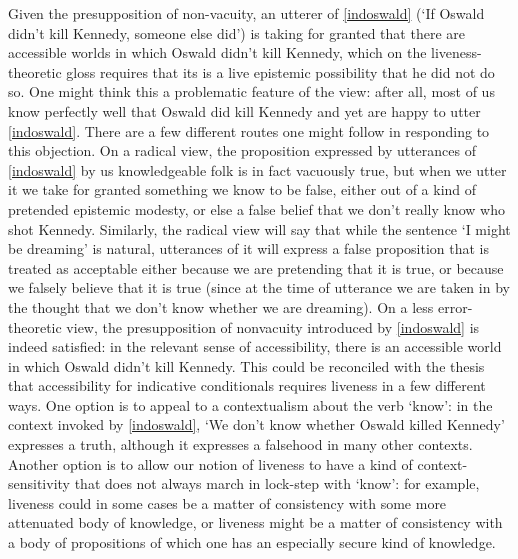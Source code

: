 \documentclass[If.tex]{subfiles}
\begin{document}
Given the presupposition of non-vacuity, an utterer of \ref{indoswald} (‘If Oswald didn't kill Kennedy, someone else did’) is taking for granted that there are accessible worlds in which Oswald didn't kill Kennedy, which on the liveness-theoretic gloss requires that its is a live epistemic possibility that he did not do so. One might think this a problematic feature of the view: after all, most of us know perfectly well that Oswald did kill Kennedy and yet are happy to utter \ref{indoswald}. There are a few different routes one might follow in responding to this objection. On a radical view, the proposition expressed by utterances of \ref{indoswald} by us knowledgeable folk is in fact vacuously true, but when we utter it we take for granted something we know to be false, either out of a kind of pretended epistemic modesty, or else a false belief that we don't really know who shot Kennedy. Similarly, the radical view will say that while the sentence ‘I might be dreaming’ is natural, utterances of it will express a false proposition that is treated as acceptable either because we are pretending that it is true, or because we falsely believe that it is true (since at the time of utterance we are taken in by the thought that we don't know whether we are dreaming). On a less error-theoretic view, the presupposition of nonvacuity introduced by \ref{indoswald} is indeed satisfied: in the relevant sense of accessibility, there is an accessible world in which Oswald didn't kill Kennedy. This could be reconciled with the thesis that accessibility for indicative conditionals requires liveness in a few different ways. One option is to appeal to a contextualism about the verb ‘know’: in the context invoked by \ref{indoswald}, ‘We don't know whether Oswald killed Kennedy’ expresses a truth, although it expresses a falsehood in many other contexts. Another option is to allow our notion of liveness to have a kind of context-sensitivity that does not always march in lock-step with ‘know’: for example, liveness could in some cases be a matter of consistency with some more attenuated body of knowledge, or liveness might be a matter of consistency with a body of propositions of which one has an especially secure kind of knowledge.
\end{document}
